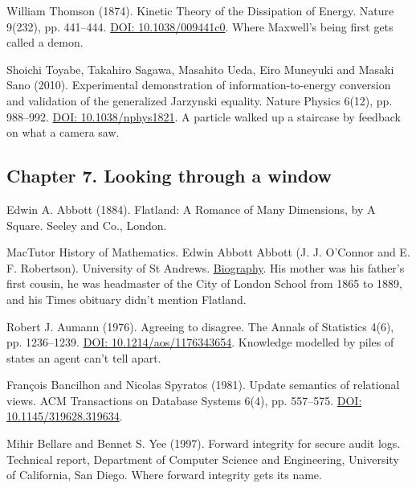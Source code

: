 \documentclass[11pt,twoside]{article}
\theoremstyle{thielethm}
\theoremstyle{thieledef}
\theoremstyle{thieledef}
\theoremstyle{thieledef}
\theoremstyle{thielethm}
\theoremstyle{thieleobs}
\theoremstyle{thielethm}
\begin{document}
\noindent William Thomson (1874). Kinetic Theory of the Dissipation of Energy. Nature 9(232), pp. 441--444. \href{https://doi.org/10.1038/009441c0}{DOI: 10.1038/009441c0}. Where Maxwell's being first gets called a demon.
\par\medskip

\noindent Shoichi Toyabe, Takahiro Sagawa, Masahito Ueda, Eiro Muneyuki and Masaki Sano (2010). Experimental demonstration of information-to-energy conversion and validation of the generalized Jarzynski equality. Nature Physics 6(12), pp. 988--992. \href{https://doi.org/10.1038/nphys1821}{DOI: 10.1038/nphys1821}. A particle walked up a staircase by feedback on what a camera saw.
\par\medskip

\subsection*{Chapter 7. Looking through a window}

\noindent Edwin A. Abbott (1884). Flatland: A Romance of Many Dimensions, by A Square. Seeley and Co., London.
\par\medskip

\noindent MacTutor History of Mathematics. Edwin Abbott Abbott (J. J. O'Connor and E. F. Robertson). University of St Andrews. \href{https://mathshistory.st-andrews.ac.uk/Biographies/Abbott/}{Biography}. His mother was his father's first cousin, he was headmaster of the City of London School from 1865 to 1889, and his Times obituary didn't mention Flatland.
\par\medskip

\noindent Robert J. Aumann (1976). Agreeing to disagree. The Annals of Statistics 4(6), pp. 1236--1239. \href{https://doi.org/10.1214/aos/1176343654}{DOI: 10.1214/aos/1176343654}. Knowledge modelled by piles of states an agent can't tell apart.
\par\medskip

\noindent Fran\c{c}ois Bancilhon and Nicolas Spyratos (1981). Update semantics of relational views. ACM Transactions on Database Systems 6(4), pp. 557--575. \href{https://doi.org/10.1145/319628.319634}{DOI: 10.1145/319628.319634}.
\par\medskip

\noindent Mihir Bellare and Bennet S. Yee (1997). Forward integrity for secure audit logs. Technical report, Department of Computer Science and Engineering, University of California, San Diego. Where forward integrity gets its name.
\par\medskip
\end{document}
